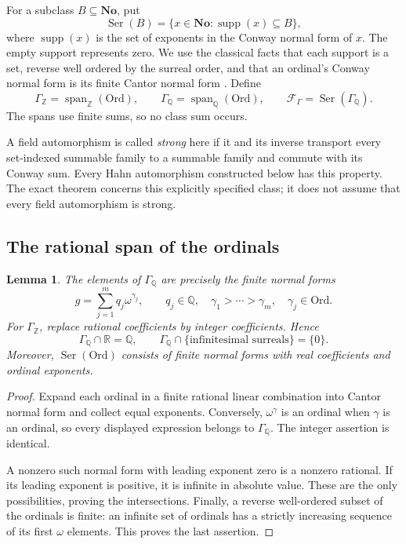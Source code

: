\documentclass[11pt,a4paper]{article}
\numberwithin{equation}{section}
\newtheorem{lemma}[lemma]{Lemma}
\theoremstyle{definition}
\theoremstyle{remark}
\newcommand{\No}{\mathbf{No}}
\newcommand{\Ord}{\mathrm{Ord}}
\newcommand{\Z}{\mathbb Z}
\newcommand{\Q}{\mathbb Q}
\newcommand{\R}{\mathbb R}
\newcommand{\supp}{\operatorname{supp}}
\begin{document}
For a subclass \(B\subseteq\No\), put
\[
 \operatorname{Ser}(B)=\{x\in\No:\supp(x)\subseteq B\},
\]
where \(\supp(x)\) is the set of exponents in the Conway normal form of
\(x\). The empty support represents zero. We use the classical facts that
each support is a set, reverse well ordered by the surreal order, and that
an ordinal's Conway normal form is its finite Cantor normal form
\cite{Gonshor}. Define
\begin{equation}\label{dsn:rp:eq:fields}
 \Gamma_{\Z}=\operatorname{span}_{\mathbb Z}(\Ord),\qquad
 \Gamma_{\Q}=\operatorname{span}_{\Q}(\Ord),\qquad
 \mathcal F_\Gamma=\operatorname{Ser}(\Gamma_{\Q}).
\end{equation}
The spans use finite sums, so no class sum occurs.

A field automorphism is called \emph{strong} here if it and its inverse
transport every set-indexed summable family to a summable family and
commute with its Conway sum. Every Hahn automorphism constructed below has
this property. The exact theorem concerns this explicitly specified
class; it does not assume that every field automorphism is strong.

\subsection{The rational span of the ordinals}

\begin{lemma}\label{dsn:rp:lem:rational-span}
The elements of \(\Gamma_{\Q}\) are precisely the finite normal forms
\[
 g=\sum_{j=1}^{m}q_j\omega^{\gamma_j},\qquad
 q_j\in\Q,\quad \gamma_1>\cdots>\gamma_m,\quad\gamma_j\in\Ord.
\]
For \(\Gamma_{\Z}\), replace rational coefficients by integer coefficients. Hence
\[
 \Gamma_{\Q}\cap\R=\Q,\qquad
 \Gamma_{\Q}\cap\{\text{infinitesimal surreals}\}=\{0\}.
\]
Moreover, \(\operatorname{Ser}(\Ord)\) consists of finite normal forms with
real coefficients and ordinal exponents.
\end{lemma}

\begin{proof}
Expand each ordinal in a finite rational linear combination into Cantor
normal form and collect equal exponents. Conversely, \(\omega^\gamma\)
is an ordinal when \(\gamma\) is an ordinal, so every displayed expression
belongs to \(\Gamma_{\Q}\). The integer assertion is identical.

A nonzero such normal form with leading exponent zero is a nonzero
rational. If its leading exponent is positive, it is infinite in absolute
value. These are the only possibilities, proving the intersections.
Finally, a reverse well-ordered subset of the ordinals is finite: an
infinite set of ordinals has a strictly increasing sequence of its first
\(\omega\) elements. This proves the last assertion.
\end{proof}
\end{document}
